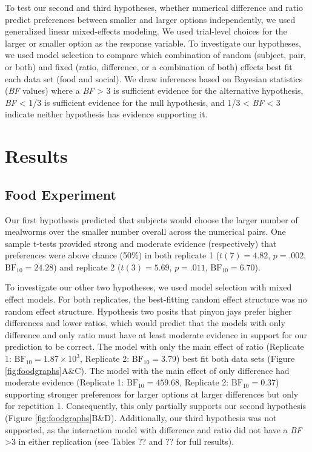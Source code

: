 \documentclass[
  ,doc,floatsintext]{apa6}
\begin{document}
To test our second and third hypotheses, whether numerical difference and ratio predict preferences between smaller and larger options independently, we used generalized linear mixed-effects modeling. We used trial-level choices for the larger or smaller option as the response variable. To investigate our hypotheses, we used model selection to compare which combination of random (subject, pair, or both) and fixed (ratio, difference, or a combination of both) effects best fit each data set (food and social). We draw inferences based on Bayesian statistics (\emph{BF} values) where a \emph{BF} \textgreater{} 3 is sufficient evidence for the alternative hypothesis, \emph{BF} \textless{} 1/3 is sufficient evidence for the null hypothesis, and 1/3 \textless{} \emph{BF} \textless{} 3 indicate neither hypothesis has evidence supporting it.

\hypertarget{results}{%
\section{Results}\label{results}}

\hypertarget{food-experiment-1}{%
\subsection{Food Experiment}\label{food-experiment-1}}

Our first hypothesis predicted that subjects would choose the larger number of mealworms over the smaller number overall across the numerical pairs. One sample t-tests provided strong and moderate evidence (respectively) that preferences were above chance (50\%) in both replicate 1 (\(t(7) = 4.82\), \(p = .002\), \(\mathrm{BF}_{\textrm{10}} = 24.28\)) and replicate 2 (\(t(3) = 5.69\), \(p = .011\), \(\mathrm{BF}_{\textrm{10}} = 6.70\)).

To investigate our other two hypotheses, we used model selection with mixed effect models. For both replicates, the best-fitting random effect structure was no random effect structure. Hypothesis two posits that pinyon jays prefer higher differences and lower ratios, which would predict that the models with only difference and only ratio must have at least moderate evidence in support for our prediction to be correct. The model with only the main effect of ratio (Replicate 1: \(\mathrm{BF}_{\textrm{10}} = 1.87 \times 10^{3}\), Replicate 2: \(\mathrm{BF}_{\textrm{10}} = 3.79\)) best fit both data sets (Figure \ref{fig:foodgraphs}A\&C). The model with the main effect of only difference had moderate evidence (Replicate 1: \(\mathrm{BF}_{\textrm{10}} = 459.68\), Replicate 2: \(\mathrm{BF}_{\textrm{10}} = 0.37\)) supporting stronger preferences for larger options at larger differences but only for repetition 1. Consequently, this only partially supports our second hypothesis (Figure \ref{fig:foodgraphs}B\&D). Additionally, our third hypothesis was not supported, as the interaction model with difference and ratio did not have a \emph{BF} \textgreater3 in either replication (see Tables ?? and ?? for full results).
\end{document}
